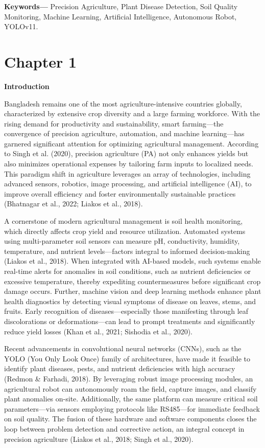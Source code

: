 \documentclass{book} %
\begin{document}
\noindent \textbf{Keywords---} Precision Agriculture, Plant Disease Detection, Soil Quality Monitoring, Machine Learning, Artificial Intelligence, Autonomous Robot, YOLOv11.\eject \textbf{}

\noindent 
\chapter{Chapter 1}

\noindent \textbf{Introduction}

\noindent Bangladesh remains one of the most agriculture-intensive countries globally, characterized by extensive crop diversity and a large farming workforce. With the rising demand for productivity and sustainability, smart farming---the convergence of precision agriculture, automation, and machine learning---has garnered significant attention for optimizing agricultural management. According to Singh et al. (2020), precision agriculture (PA) not only enhances yields but also minimizes operational expenses by tailoring farm inputs to localized needs. This paradigm shift in agriculture leverages an array of technologies, including advanced sensors, robotics, image processing, and artificial intelligence (AI), to improve overall efficiency and foster environmentally sustainable practices (Bhatnagar et al., 2022; Liakos et al., 2018).

\noindent A cornerstone of modern agricultural management is soil health monitoring, which directly affects crop yield and resource utilization. Automated systems using multi-parameter soil sensors can measure pH, conductivity, humidity, temperature, and nutrient levels---factors integral to informed decision-making (Liakos et al., 2018). When integrated with AI-based models, such systems enable real-time alerts for anomalies in soil conditions, such as nutrient deficiencies or excessive temperature, thereby expediting countermeasures before significant crop damage occurs. Further, machine vision and deep learning methods enhance plant health diagnostics by detecting visual symptoms of disease on leaves, stems, and fruits. Early recognition of diseases---especially those manifesting through leaf discolorations or deformations---can lead to prompt treatments and significantly reduce yield losses (Khan et al., 2021; Sishodia et al., 2020).

\noindent Recent advancements in convolutional neural networks (CNNs), such as the YOLO (You Only Look Once) family of architectures, have made it feasible to identify plant diseases, pests, and nutrient deficiencies with high accuracy (Redmon \& Farhadi, 2018). By leveraging robust image processing modules, an agricultural robot can autonomously roam the field, capture images, and classify plant anomalies on-site. Additionally, the same platform can measure critical soil parameters---via sensors employing protocols like RS485---for immediate feedback on soil quality. The fusion of these hardware and software components closes the loop between problem detection and corrective action, an integral concept in precision agriculture (Liakos et al., 2018; Singh et al., 2020).
\end{document}
